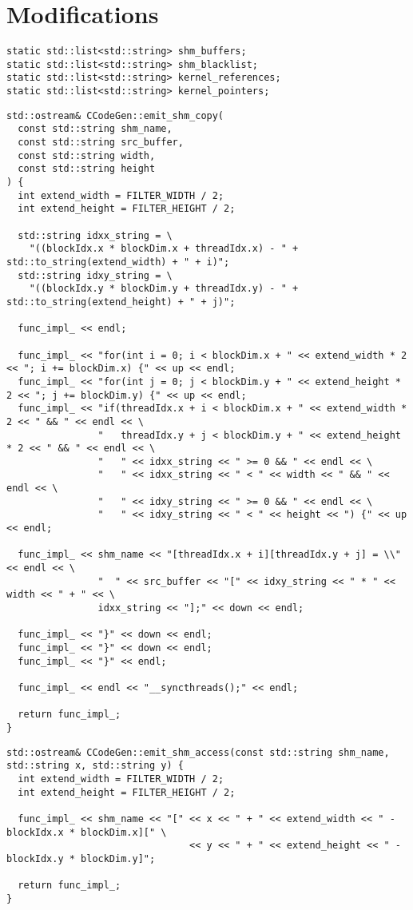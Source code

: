 \documentclass{article}
\begin{document}
\section{Modifications}

\begin{verbatim}
static std::list<std::string> shm_buffers;
static std::list<std::string> shm_blacklist;
static std::list<std::string> kernel_references;
static std::list<std::string> kernel_pointers;
\end{verbatim}

\begin{verbatim}
std::ostream& CCodeGen::emit_shm_copy(
  const std::string shm_name,
  const std::string src_buffer,
  const std::string width,
  const std::string height
) {
  int extend_width = FILTER_WIDTH / 2;
  int extend_height = FILTER_HEIGHT / 2;

  std::string idxx_string = \
    "((blockIdx.x * blockDim.x + threadIdx.x) - " + std::to_string(extend_width) + " + i)";
  std::string idxy_string = \
    "((blockIdx.y * blockDim.y + threadIdx.y) - " + std::to_string(extend_height) + " + j)";

  func_impl_ << endl;

  func_impl_ << "for(int i = 0; i < blockDim.x + " << extend_width * 2 << "; i += blockDim.x) {" << up << endl;
  func_impl_ << "for(int j = 0; j < blockDim.y + " << extend_height * 2 << "; j += blockDim.y) {" << up << endl;
  func_impl_ << "if(threadIdx.x + i < blockDim.x + " << extend_width * 2 << " && " << endl << \
                "   threadIdx.y + j < blockDim.y + " << extend_height * 2 << " && " << endl << \
                "   " << idxx_string << " >= 0 && " << endl << \
                "   " << idxx_string << " < " << width << " && " << endl << \
                "   " << idxy_string << " >= 0 && " << endl << \
                "   " << idxy_string << " < " << height << ") {" << up << endl;

  func_impl_ << shm_name << "[threadIdx.x + i][threadIdx.y + j] = \\" << endl << \
                "  " << src_buffer << "[" << idxy_string << " * " << width << " + " << \
                idxx_string << "];" << down << endl;

  func_impl_ << "}" << down << endl;
  func_impl_ << "}" << down << endl;
  func_impl_ << "}" << endl;

  func_impl_ << endl << "__syncthreads();" << endl;

  return func_impl_;
}

\end{verbatim}
\begin{verbatim}
std::ostream& CCodeGen::emit_shm_access(const std::string shm_name, std::string x, std::string y) {
  int extend_width = FILTER_WIDTH / 2;
  int extend_height = FILTER_HEIGHT / 2;

  func_impl_ << shm_name << "[" << x << " + " << extend_width << " - blockIdx.x * blockDim.x][" \
                                << y << " + " << extend_height << " - blockIdx.y * blockDim.y]";

  return func_impl_;
}
\end{verbatim}
\end{document}
